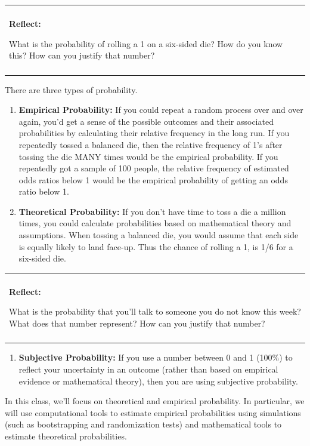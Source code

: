 \documentclass[
]{book}
\providecommand{\tightlist}{%
  \setlength{\itemsep}{0pt}\setlength{\parskip}{0pt}}
\newenvironment{reflect}
{
    \begin{center}
    
    \begin{tabular}{|p{0.8\textwidth}|}
    \rowcolor{LightBlue}
    \hline\\
    \rowcolor{LightBlue}
    \textbf{Reflect:}
}
{
    \\\rowcolor{LightBlue}
    \\\hline
    \end{tabular} 
    \end{center}
}
\begin{document}
\begin{reflect}
What is the probability of rolling a 1 on a six-sided die? How do you
know this? How can you justify that number?
\end{reflect}

There are three types of probability.

\begin{enumerate}
\def\labelenumi{\arabic{enumi}.}
\item
  \textbf{Empirical Probability:} If you could repeat a random process over and over again, you'd get a sense of the possible outcomes and their associated probabilities by calculating their relative frequency in the long run. If you repeatedly tossed a balanced die, then the relative frequency of 1's after tossing the die MANY times would be the empirical probability. If you repeatedly got a sample of 100 people, the relative frequency of estimated odds ratios below 1 would be the empirical probability of getting an odds ratio below 1.
\item
  \textbf{Theoretical Probability:} If you don't have time to toss a die a million times, you could calculate probabilities based on mathematical theory and assumptions. When tossing a balanced die, you would assume that each side is equally likely to land face-up. Thus the chance of rolling a 1, is 1/6 for a six-sided die.
\end{enumerate}

\begin{reflect}
What is the probability that you'll talk to someone you do not know this
week? What does that number represent? How can you justify that number?
\end{reflect}

\begin{enumerate}
\def\labelenumi{\arabic{enumi}.}
\setcounter{enumi}{2}
\tightlist
\item
  \textbf{Subjective Probability:} If you use a number between 0 and 1 (100\%) to reflect your uncertainty in an outcome (rather than based on empirical evidence or mathematical theory), then you are using subjective probability.
\end{enumerate}

In this class, we'll focus on theoretical and empirical probability. In particular, we will use computational tools to estimate empirical probabilities using simulations (such as bootstrapping and randomization tests) and mathematical tools to estimate theoretical probabilities.
\end{document}
